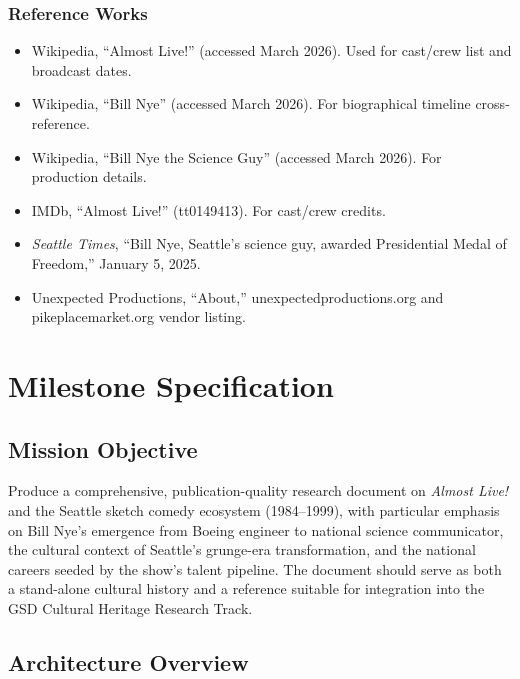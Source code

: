 \documentclass[11pt,letterpaper]{article}
\newcommand{\stageheader}[2]{%
  \noindent\colorbox{#2}{\makebox[\textwidth][l]{%
    \textcolor{white}{\bfseries\sffamily\hspace{6pt}#1\hspace{6pt}}}}%
  \vspace{0.5em}\par%
}
\begin{document}
\subsubsection{Reference Works}
\begin{itemize}[noitemsep]
  \item Wikipedia, ``Almost Live!'' (accessed March 2026). Used for cast/crew list and broadcast dates.
  \item Wikipedia, ``Bill Nye'' (accessed March 2026). For biographical timeline cross-reference.
  \item Wikipedia, ``Bill Nye the Science Guy'' (accessed March 2026). For production details.
  \item IMDb, ``Almost Live!'' (tt0149413). For cast/crew credits.
  \item \textit{Seattle Times}, ``Bill Nye, Seattle's science guy, awarded Presidential Medal of Freedom,'' January 5, 2025.
  \item Unexpected Productions, ``About,'' unexpectedproductions.org and pikeplacemarket.org vendor listing.
\end{itemize}

\newpage

\stageheader{STAGE 3 --- MISSION PACKAGE}{tertiary}

\section{Milestone Specification}

\subsection{Mission Objective}

Produce a comprehensive, publication-quality research document on \textit{Almost Live!} and the Seattle sketch comedy ecosystem (1984--1999), with particular emphasis on Bill Nye's emergence from Boeing engineer to national science communicator, the cultural context of Seattle's grunge-era transformation, and the national careers seeded by the show's talent pipeline. The document should serve as both a stand-alone cultural history and a reference suitable for integration into the GSD Cultural Heritage Research Track.

\subsection{Architecture Overview}
\end{document}
